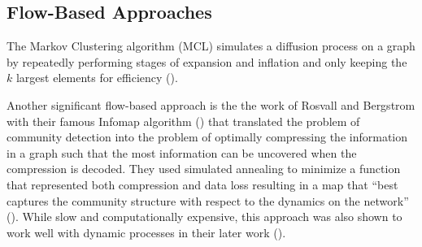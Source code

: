\documentclass[
11pt, %
english, %
singlespacing, %
headsepline, %
]{MastersDoctoralThesis} %
\begin{document}
\subsection{Flow-Based Approaches}
The Markov Clustering algorithm (MCL) simulates a diffusion process on a graph by repeatedly performing stages of expansion and inflation and only keeping the $k$ largest elements for efficiency (\cite{van2001graph}). 

Another significant flow-based approach is the the work of Rosvall and Bergstrom with their famous Infomap algorithm (\cite{rosvall2007information}) that translated the problem of community detection into the problem of optimally compressing the information in a graph such that the most information can be uncovered when the compression is decoded. 
They used simulated annealing to minimize a function that represented both compression and data loss resulting in a map that ``best captures the community structure with respect to the dynamics on the network'' (\cite{de2015identifying}). 
While slow and computationally expensive, this approach was also shown to work well with dynamic processes in their later work (\cite{rosvall2008maps}). 

\end{document}
